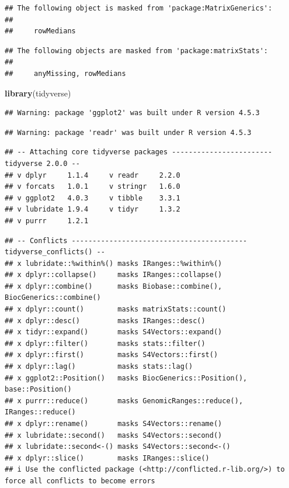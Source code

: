 \documentclass[
]{article}
\newenvironment{Shaded}{\begin{snugshade}}{\end{snugshade}}
\newcommand{\FunctionTok}[1]{\textcolor[rgb]{0.13,0.29,0.53}{\textbf{#1}}}
\newcommand{\NormalTok}[1]{#1}
\begin{document}
\begin{verbatim}
## The following object is masked from 'package:MatrixGenerics':
## 
##     rowMedians
\end{verbatim}

\begin{verbatim}
## The following objects are masked from 'package:matrixStats':
## 
##     anyMissing, rowMedians
\end{verbatim}

\begin{Shaded}
\begin{Highlighting}[]
\FunctionTok{library}\NormalTok{(tidyverse)}
\end{Highlighting}
\end{Shaded}

\begin{verbatim}
## Warning: package 'ggplot2' was built under R version 4.5.3
\end{verbatim}

\begin{verbatim}
## Warning: package 'readr' was built under R version 4.5.3
\end{verbatim}

\begin{verbatim}
## -- Attaching core tidyverse packages ------------------------ tidyverse 2.0.0 --
## v dplyr     1.1.4     v readr     2.2.0
## v forcats   1.0.1     v stringr   1.6.0
## v ggplot2   4.0.3     v tibble    3.3.1
## v lubridate 1.9.4     v tidyr     1.3.2
## v purrr     1.2.1
\end{verbatim}

\begin{verbatim}
## -- Conflicts ------------------------------------------ tidyverse_conflicts() --
## x lubridate::%within%() masks IRanges::%within%()
## x dplyr::collapse()     masks IRanges::collapse()
## x dplyr::combine()      masks Biobase::combine(), BiocGenerics::combine()
## x dplyr::count()        masks matrixStats::count()
## x dplyr::desc()         masks IRanges::desc()
## x tidyr::expand()       masks S4Vectors::expand()
## x dplyr::filter()       masks stats::filter()
## x dplyr::first()        masks S4Vectors::first()
## x dplyr::lag()          masks stats::lag()
## x ggplot2::Position()   masks BiocGenerics::Position(), base::Position()
## x purrr::reduce()       masks GenomicRanges::reduce(), IRanges::reduce()
## x dplyr::rename()       masks S4Vectors::rename()
## x lubridate::second()   masks S4Vectors::second()
## x lubridate::second<-() masks S4Vectors::second<-()
## x dplyr::slice()        masks IRanges::slice()
## i Use the conflicted package (<http://conflicted.r-lib.org/>) to force all conflicts to become errors
\end{verbatim}
\end{document}
